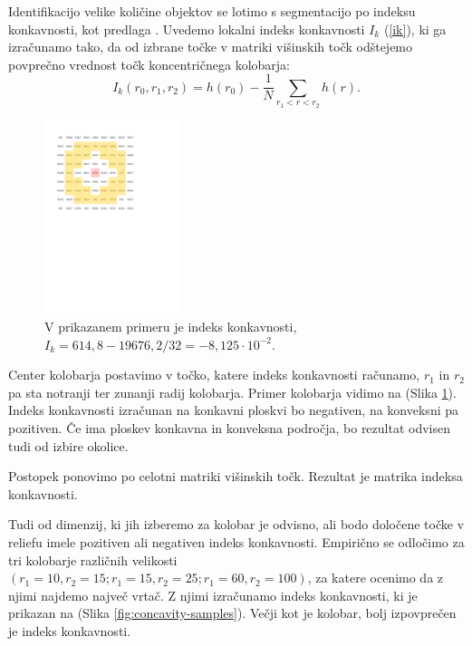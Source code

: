 \documentclass[a4paper, twoside, 12pt]{book}
\begin{document}
Identifikacijo velike količine objektov se lotimo s segmentacijo po indeksu konkavnosti, kot predlaga \cite{doctor13}. Uvedemo lokalni indeks konkavnosti $I_k$ (\ref{ik}), ki ga izračunamo tako, da od izbrane točke v matriki višinskih točk odštejemo povprečno vrednost točk koncentričnega kolobarja:
\begin{equation}  I_k(r_0,r_1,r_2) = h(r_0)- \frac{1}{N}\sum\limits_{r_1<r<r_2} h(r). \label{ik} \end{equation}

  \begin{figure}[h!]
    \begin{center}
      \includegraphics[width=4cm]{slike/concavity-ring-visualisation-2}
    \end{center}
    \caption{V prikazanem primeru je indeks konkavnosti, $I_k = 614,8 - 19676,2/32 = - 8,125 \cdot 10^{-2}$.}
    \label{fig:concavity-ring}
  \end{figure}

Center kolobarja postavimo v točko, katere indeks konkavnosti računamo, $r_1$ in $r_2$ pa sta notranji ter zunanji radij kolobarja.
Primer kolobarja vidimo na (Slika \ref{fig:concavity-ring}). Indeks konkavnosti izračunan na konkavni ploskvi bo negativen, na konveksni pa pozitiven. Če ima ploskev konkavna in konveksna področja, bo rezultat odvisen tudi od izbire okolice.

Postopek ponovimo po celotni matriki višinskih točk. Rezultat je matrika indeksa konkavnosti.

Tudi od dimenzij, ki jih izberemo za kolobar je odvisno, ali bodo določene točke v reliefu imele pozitiven ali negativen indeks konkavnosti. Empirično se odločimo za tri kolobarje različnih velikosti $(r_1=10,r_2=15;r_1=15,r_2=25;r_1=60,r_2=100)$, za katere ocenimo da z njimi najdemo največ vrtač. Z njimi izračunamo indeks konkavnosti, ki je prikazan na (Slika \ref{fig:concavity-samples}). Večji kot je kolobar, bolj izpovprečen je indeks konkavnosti.
\end{document}
